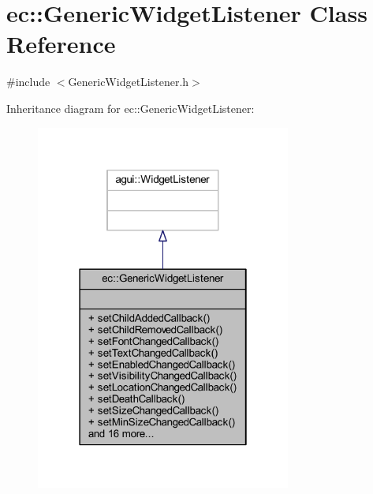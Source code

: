 \hypertarget{classec_1_1_generic_widget_listener}{}\section{ec\+:\+:Generic\+Widget\+Listener Class Reference}
\label{classec_1_1_generic_widget_listener}


{\ttfamily \#include $<$Generic\+Widget\+Listener.\+h$>$}



Inheritance diagram for ec\+:\+:Generic\+Widget\+Listener\+:\nopagebreak
\begin{figure}[H]
\begin{center}
\leavevmode
\includegraphics[width=238pt]{classec_1_1_generic_widget_listener__inherit__graph}
\end{center}
\end{figure}



